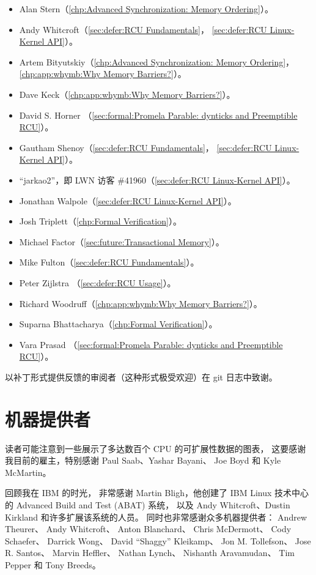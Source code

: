 \begin{itemize}
\item	Alan Stern（\cref{chp:Advanced Synchronization: Memory Ordering}）。
\item	Andy Whitcroft（\cref{sec:defer:RCU Fundamentals}，
	\cref{sec:defer:RCU Linux-Kernel API}）。
\item	Artem Bityutskiy（\cref{chp:Advanced Synchronization: Memory Ordering}，
	\cref{chp:app:whymb:Why Memory Barriers?}）。
\item	Dave Keck（\cref{chp:app:whymb:Why Memory Barriers?}）。
\item	David S. Horner
	（\cref{sec:formal:Promela Parable: dynticks and Preemptible RCU}）。
\item	Gautham Shenoy（\cref{sec:defer:RCU Fundamentals}，
	\cref{sec:defer:RCU Linux-Kernel API}）。
\item	``jarkao2''，即 LWN 访客 \#41960（\cref{sec:defer:RCU Linux-Kernel API}）。
\item	Jonathan Walpole（\cref{sec:defer:RCU Linux-Kernel API}）。
\item	Josh Triplett（\cref{chp:Formal Verification}）。
\item	Michael Factor（\cref{sec:future:Transactional Memory}）。
\item	Mike Fulton（\cref{sec:defer:RCU Fundamentals}）。
\item	Peter Zijlstra
	（\cref{sec:defer:RCU Usage}）。%
\item	Richard Woodruff（\cref{chp:app:whymb:Why Memory Barriers?}）。
\item	Suparna Bhattacharya（\cref{chp:Formal Verification}）。
\item	Vara Prasad
	（\cref{sec:formal:Promela Parable: dynticks and Preemptible RCU}）。
\end{itemize}

以补丁形式提供反馈的审阅者（这种形式极受欢迎）在 git 日志中致谢。

\section{机器提供者}

读者可能注意到一些展示了多达数百个 CPU 的可扩展性数据的图表，
这要感谢我目前的雇主，特别感谢 Paul Saab、Yashar Bayani、
Joe Boyd 和 Kyle McMartin。

回顾我在 IBM 的时光，
非常感谢 Martin Bligh，他创建了 IBM Linux 技术中心的
Advanced Build and Test (ABAT) 系统，
以及 Andy Whitcroft、Dustin Kirkland 和许多扩展该系统的人员。
同时也非常感谢众多机器提供者：
Andrew Theurer、
Andy Whitcroft、
Anton Blanchard、
Chris McDermott、
Cody Schaefer、
Darrick Wong、
David ``Shaggy'' Kleikamp、
Jon M. Tollefson、
Jose R. Santos、
Marvin Heffler、
Nathan Lynch、
Nishanth Aravamudan、
Tim Pepper
和
Tony Breeds。

